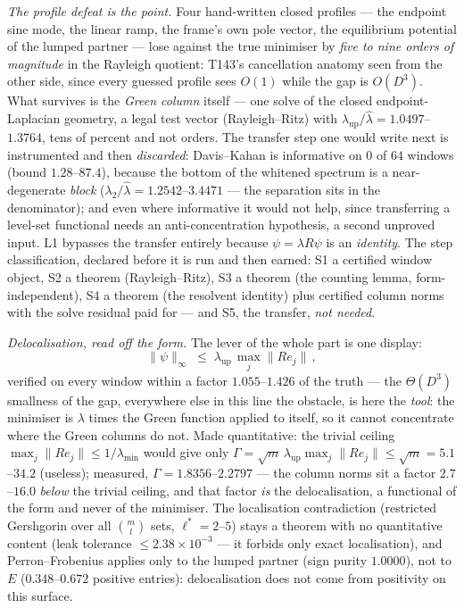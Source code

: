 \documentclass[11pt,a4paper]{article}
\begin{document}
\emph{The profile defeat is the point.} Four hand-written closed profiles --- the endpoint
sine mode, the linear ramp, the frame's own pole vector, the equilibrium potential of the
lumped partner --- lose against the true minimiser by \emph{five to nine orders of magnitude}
in the Rayleigh quotient: T143's cancellation anatomy seen from the other side, since every
guessed profile sees $O(1)$ while the gap is $O(D^3)$. What survives is the \emph{Green
column} itself --- one solve of the closed endpoint-Laplacian geometry, a legal test vector
(Rayleigh--Ritz) with $\lambda_{\mathrm{up}}/\hat\lambda=1.0497$--$1.3764$, tens of percent
and not orders. The transfer step one would write next is instrumented and then
\emph{discarded}: Davis--Kahan is informative on $0$ of $64$ windows (bound $1.28$--$87.4$),
because the bottom of the whitened spectrum is a near-degenerate \emph{block}
($\lambda_2/\hat\lambda=1.2542$--$3.4471$ --- the separation sits in the denominator); and
even where informative it would not help, since transferring a level-set functional needs an
anti-concentration hypothesis, a second unproved input. L1 bypasses the transfer entirely
because $\psi=\lambda R\psi$ is an \emph{identity}. The step classification, declared before
it is run and then earned: S1 a certified window object, S2 a theorem (Rayleigh--Ritz), S3 a
theorem (the counting lemma, form-independent), S4 a theorem (the resolvent identity) plus
certified column norms with the solve residual paid for --- and S5, the transfer, \emph{not
needed}.

\emph{Delocalisation, read off the form.} The lever of the whole part is one display:
\[
\|\psi\|_\infty\;\le\;\lambda_{\mathrm{up}}\,\max_j\|R e_j\|\,,
\]
verified on every window within a factor $1.055$--$1.426$ of the truth --- the $\Theta(D^3)$
smallness of the gap, everywhere else in this line the obstacle, is here the \emph{tool}: the
minimiser is $\lambda$ times the Green function applied to itself, so it cannot concentrate
where the Green columns do not. Made quantitative: the trivial ceiling
$\max_j\|Re_j\|\le1/\lambda_{\min}$ would give only $\Gamma=\sqrt m\,\lambda_{\mathrm{up}}
\max_j\|Re_j\|\le\sqrt m=5.1$--$34.2$ (useless); measured, $\Gamma=1.8356$--$2.2797$ --- the
column norms sit a factor $2.7$--$16.0$ \emph{below} the trivial ceiling, and that factor
\emph{is} the delocalisation, a functional of the form and never of the minimiser. The
localisation contradiction (restricted Gershgorin over all $\binom{m}{l}$ sets, $\ell^*=2$--$5$)
stays a theorem with no quantitative content (leak tolerance $\le2.38\times10^{-3}$ --- it
forbids only exact localisation), and Perron--Frobenius applies only to the lumped partner
(sign purity $1.0000$), not to $E$ ($0.348$--$0.672$ positive entries): delocalisation does
not come from positivity on this surface.
\end{document}
